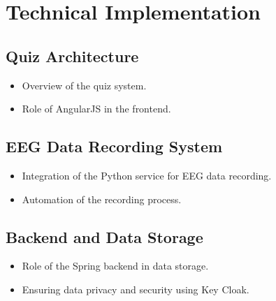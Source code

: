 \chapter{\rm\bfseries Technical Implementation}
\label{ch:techimpl}

\section{Quiz Architecture}
\begin{itemize}
    \item Overview of the quiz system.
    \item Role of AngularJS in the frontend.
\end{itemize}

\section{EEG Data Recording System}
\begin{itemize}
    \item Integration of the Python service for EEG data recording.
    \item Automation of the recording process.
\end{itemize}

\section{Backend and Data Storage}
\begin{itemize}
    \item Role of the Spring backend in data storage.
    \item Ensuring data privacy and security using Key Cloak.
\end{itemize}
